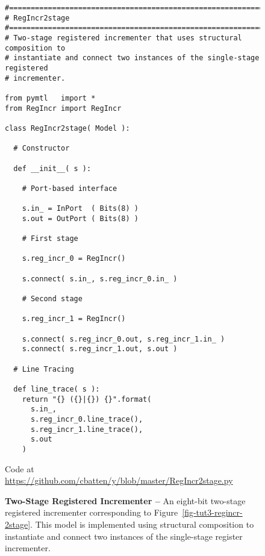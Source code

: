 
\begin{figure}

  \begin{lstlisting}[xleftmargin={0.9in}]
#=========================================================================
# RegIncr2stage
#=========================================================================
# Two-stage registered incrementer that uses structural composition to
# instantiate and connect two instances of the single-stage registered
# incrementer.

from pymtl   import *
from RegIncr import RegIncr

class RegIncr2stage( Model ):

  # Constructor

  def __init__( s ):

    # Port-based interface

    s.in_ = InPort  ( Bits(8) )
    s.out = OutPort ( Bits(8) )

    # First stage

    s.reg_incr_0 = RegIncr()

    s.connect( s.in_, s.reg_incr_0.in_ )

    # Second stage

    s.reg_incr_1 = RegIncr()

    s.connect( s.reg_incr_0.out, s.reg_incr_1.in_ )
    s.connect( s.reg_incr_1.out, s.out )

  # Line Tracing

  def line_trace( s ):
    return "{} ({}|{}) {}".format(
      s.in_,
      s.reg_incr_0.line_trace(),
      s.reg_incr_1.line_trace(),
      s.out
    )
\end{lstlisting}

  \centerline{\small Code at
    \url{https://github.com/cbatten/y/blob/master/RegIncr2stage.py}}

  \caption{\textbf{Two-Stage Registered Incrementer --} An eight-bit
    two-stage registered incrementer corresponding to
    Figure~\ref{fig-tut3-regincr-2stage}. This model is implemented using
    structural composition to instantiate and connect two instances of the
    single-stage register incrementer.}
  \label{code-tut3-regincr-2stage}

\end{figure}


